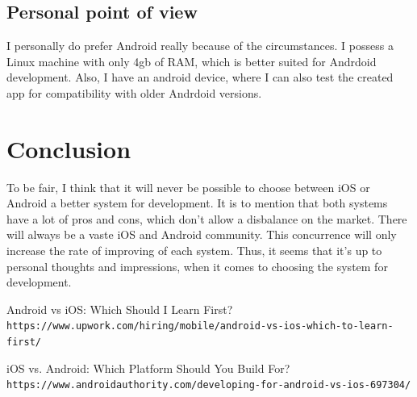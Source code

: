 \documentclass[12pt]{article}
\begin{document}
        \subsection*{Personal point of view}
            I personally do prefer Android really because of the circumstances. I possess a Linux machine with only 4gb of RAM, which is better suited for Andrdoid development. Also, I have an android device, where I can also test the created app for compatibility with older Andrdoid versions.


    \newpage

    \section*{Conclusion}
        To be fair, I think that it will never be possible to choose between iOS or Android a better system for development. It is to mention that both systems have a lot of pros and cons, which don't allow a disbalance on the market. There will always be a vaste iOS and Android community. This concurrence will only increase the rate of improving of each system. Thus, it seems that it's up to personal thoughts and impressions, when it comes to choosing the system for development.



    \begin{thebibliography}{9}
        Android vs iOS: Which Should I Learn First?
        \\\texttt{https://www.upwork.com/hiring/mobile/android-vs-ios-which-to-learn-first/}

        iOS vs. Android: Which Platform Should You Build For?
        \\\texttt{https://www.androidauthority.com/developing-for-android-vs-ios-697304/}
        \end{thebibliography}
\end{document}
